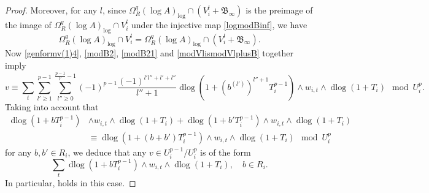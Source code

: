 \documentclass[11pt]{amsart}
\newcommand{\eq}[2]{\begin{equation}\label{#1}#2 \end{equation}}
\newcommand{\sB}{\mathfrak{B}}
\newcommand{\dlog}{\operatorname{dlog}}
\theoremstyle{plain}
\theoremstyle{definition}
\numberwithin{equation}{prop}
\begin{document}
\begin{proof}
Moreover, for any $l$, since $\Omega^q_{R}(\log A)_{\log}\cap (V_i^l+\sB_\infty)$ is the preimage of the image of $\Omega^q_{R}(\log A)_{\log}\cap V_i^l$ under the injective map \eqref{logmodBinf}, we have
\eq{modVlismodVlplusB}{\Omega^q_{R}(\log A)_{\log}\cap V_i^l=\Omega^q_{R}(\log A)_{\log}\cap (V_i^l+\sB_\infty).}
Now \eqref{genformv(1)4}, \eqref{modB2}, \eqref{modB21} and \eqref{modVlismodVlplusB} together imply
$$v\equiv 
\sum_t \sum_{l'\ge 1}^{p-1} \sum_{l''\ge 0}^{\frac{p-1}{l'}-1} (-1)^{p-1}
\frac{(-1)^{l'l''+l'+l''}}{l''+1}
\dlog(1+(b^{(l')})^{l''+1}T_i^{p-1})\wedge w_{i,t}\wedge \dlog(1+T_i)
\mod U_i^p.$$
Taking into account that
\begin{align*} 
\dlog(1+bT_i^{p-1})&\wedge w_{i,t}\wedge \dlog(1+T_i)+
 \dlog(1+b'T_i^{p-1})\wedge w_{i,t}\wedge \dlog(1+T_i)
\\
&\equiv
 \dlog(1+(b+b')T_i^{p-1})\wedge w_{i,t}\wedge \dlog(1+T_i)
\mod U_i^p
 \end{align*}
for any $b,b'\in R_i$, we deduce that any $v\in  U^{p-1}_i/U_i^{p}$ is of the form
$$\sum_t \dlog(1+bT_i^{p-1})\wedge w_{i,t}\wedge \dlog(1+T_i),\quad b\in R_i.$$
In particular,  holds in this case.










\end{proof}
\end{document}
